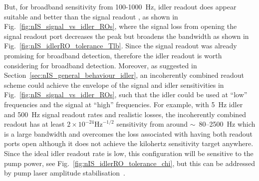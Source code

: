 But, for broadband sensitivity from 100-1000~Hz, idler readout does appear suitable and better than the signal readout , as shown in Fig.~\ref{fig:nIS_signal_vs_idler_ROs}, where the signal loss from opening the signal readout port decreases the peak but broadens the bandwidth as shown in Fig.~\ref{fig:nIS_idlerRO_tolerance_Tlb}. Since the signal readout was already promising for broadband detection, therefore the idler readout is worth considering for broadband detection. %
Moreover, as suggested in Section~\ref{sec:nIS_general_behaviour_idler}, an incoherently combined readout scheme could achieve the envelope of the signal and idler sensitivities in Fig.~\ref{fig:nIS_signal_vs_idler_ROs}, such that the idler could be used at ``low'' frequencies and the signal at ``high'' frequencies. For example, with 5~Hz idler and 500~Hz signal readout rates and realistic losses, the incoherently combined readout has at least $2\times10^{-24}\text{Hz}^{-1/2}$ sensitivity from around $\sim$~80--2500~Hz  which is a large bandwidth  and overcomes the loss associated with having both readout ports open although it does not achieve the kilohertz sensitivity target anywhere.   Since the ideal idler readout rate is low, this configuration will be sensitive to the pump power, see Fig.~\ref{fig:nIS_idlerRO_tolerance_chi}, but this can be addressed by pump laser amplitude stabilisation~\cite{}. 

